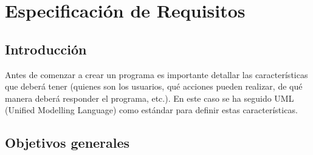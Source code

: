 \setcounter{ncu}{0}
\newcommand{\cu}[9]{
    \addtocounter{ncu}{1}

    \begin{table}[p]
        \centering
        \begin{tabularx}{\linewidth}{ p{0.21\columnwidth} p{0.71\columnwidth} }
            \toprule
            \textbf{CU-\arabic{ncu}}      & \textbf{#1} \\
            \toprule
            \textbf{Versión}              & #2          \\
            \textbf{Autor}                & \theauthor  \\
            \textbf{Requisitos asociados} & #3          \\
            \textbf{Descripción}          & #4          \\
            \textbf{Precondición}         & #5          \\
            \textbf{Acciones}             &
            #6                                          \\
            \textbf{Postcondición}        & #7          \\
            \textbf{Excepciones}          & #8          \\
            \textbf{Importancia}          & #9          \\
            \bottomrule
        \end{tabularx}
        \caption{CU-\arabic{ncu} #1.}
    \end{table}
}


\chapter{Especificación de Requisitos}
\label{cha:Especificación de Requisitos}

\section{Introducción}

Antes de comenzar a crear un programa es importante detallar las características
que deberá tener (quienes son los usuarios, qué acciones pueden realizar, de qué
manera deberá responder el programa, etc.). En este caso se ha seguido UML
(Unified Modelling Language) como estándar para definir estas características.

\section{Objetivos generales}

